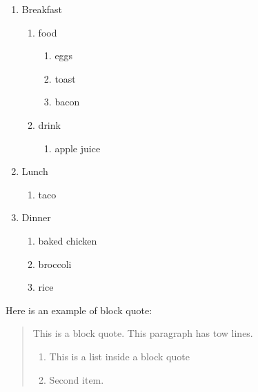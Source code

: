 \documentclass[
]{article}
\providecommand{\tightlist}{%
  \setlength{\itemsep}{0pt}\setlength{\parskip}{0pt}}
\begin{document}
\begin{enumerate}
\def\labelenumi{\arabic{enumi}.}
\tightlist
\item
  Breakfast

  \begin{enumerate}
  \def\labelenumii{\alph{enumii}.}
  \tightlist
  \item
    food

    \begin{enumerate}
    \def\labelenumiii{\roman{enumiii}.}
    \tightlist
    \item
      eggs
    \item
      toast
    \item
      bacon
    \end{enumerate}
  \item
    drink

    \begin{enumerate}
    \def\labelenumiii{\roman{enumiii}.}
    \tightlist
    \item
      apple juice
    \end{enumerate}
  \end{enumerate}
\item
  Lunch

  \begin{enumerate}
  \def\labelenumii{\alph{enumii}.}
  \tightlist
  \item
    taco
  \end{enumerate}
\item
  Dinner

  \begin{enumerate}
  \def\labelenumii{\alph{enumii}.}
  \tightlist
  \item
    baked chicken
  \item
    broccoli
  \item
    rice
  \end{enumerate}
\end{enumerate}

Here is an example of block quote:

\begin{quote}
This is a block quote. This paragraph has tow lines.

\begin{enumerate}
\def\labelenumi{\arabic{enumi}.}
\tightlist
\item
  This is a list inside a block quote
\item
  Second item.
\end{enumerate}
\end{quote}
\end{document}
